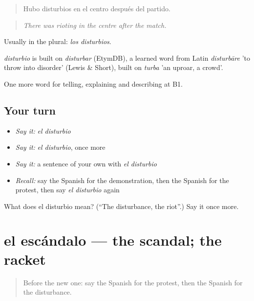 \begin{quote}
Hubo disturbios en el centro después del partido.
\end{quote}

\begin{quote}
\emph{There was rioting in the centre after the match.}
\end{quote}

Usually in the plural: \emph{los disturbios}.

\begin{cousinweb}
\emph{disturbio} is built on \emph{disturbar} (EtymDB), a learned word from Latin \emph{disturbāre} 'to throw into disorder' (Lewis \& Short), built on \emph{turba} 'an uproar, a crowd'.
\end{cousinweb}

\begin{grammarlens}[title={What you've built}]
One more word for telling, explaining and describing at B1.
\end{grammarlens}

\subsection*{Your turn}
\begin{itemize}
\raggedright
  \item \emph{Say it:} \emph{el disturbio}
  \item \emph{Say it:} \emph{el disturbio}, once more
  \item \emph{Say it:} a sentence of your own with \emph{el disturbio}
  \item \emph{Recall:} say the Spanish for the demonstration, then the Spanish for the protest, then say \emph{el disturbio} again
\end{itemize}

\begin{tcolorbox}[breakable,colback=teal!4,colframe=teal!35!black,title={Before you move on}]
What does el disturbio mean? (\textquotedblleft{}The disturbance, the riot\textquotedblright{}.) Say it once more.
\end{tcolorbox}
\section[el escándalo]{el escándalo — the scandal; the racket}

\label{lesson:ES-C570-escandalo}



\begin{quote}
Before the new one: say the Spanish for the protest, then the Spanish for the disturbance.
\end{quote}

